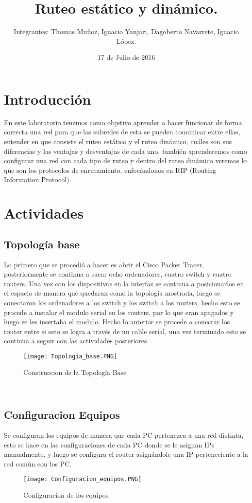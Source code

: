 \documentclass{udpreport}
\title{Ruteo estático y dinámico. }
\author{Integrantes: Thomas Muñoz, Ignacio Yanjari, Dagoberto Navarrete, Ignacio López.}
\date{17 de Julio de 2016}
\begin{document}
\maketitle
\tableofcontents
\listoffigures
\chapter{Introducción}
  En este laboratorio tenemos como objetivo aprender a hacer funcionar de forma correcta una red para que las subredes de esta se
  pueden comunicar entre ellas, entender en que consiste el ruteo estático y el ruteo dinámico, cuáles son sus diferencias y las
  ventajas y desventajas de cada uno, también aprenderemos como configurar una red con cada tipo de ruteo y dentro del ruteo dinámico
  veremos lo que son los protocolos de enrutamiento, enfocándonos en RIP (Routing Information Protocol).
\chapter{Actividades}
	\section{Topología base}
	Lo primero que se procedió a hacer es abrir el Cisco Packet Tracer, posteriormente se continua a sacar ocho ordenadores,
	cuatro switch y cuatro routers. Una vez con los dispositivos en la interfaz se continua a posicionarlos en el espacio de
	manera que quedaran como la topología mostrada, luego se conectaron los ordenadores a los switch y los switch a los
	routers, hecho esto se procede a instalar el modulo serial en los routers, por lo que eran apagados y luego se les insertaba
	el modulo. Hecho lo anterior se procede a conectar los router entre si esto se logra a través de un cable serial, una vez
	terminado esto se continua a seguir con las actividades posteriores.\\
	\begin{figure}[H]
	\centering
	\texttt{[image: Topologia\_base.PNG]}
	\caption{Construccion de la Topología Base}
	\end{figure}\\	
	\section{Configuracion Equipos}
	Se configuran los equipos de manera que cada PC pertenezca a una red distinta, esto se hace en las configuraciones de cada PC
	donde se le asignan IPs manualmente, y luego se configura el router asignándole una IP perteneciente a la red común con los 
	PC.\\
	\begin{figure}[H]
	\centering
	\texttt{[image: Configuracion\_equipos.PNG]}
	\caption{Configuracion de los equipos}
	\end{figure}\\
\end{document}
